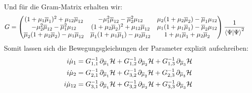 \noindent Und für die Gram-Matrix erhalten wir:
\begin{align}
    G &=
    \begin{pmatrix}
        (1+\mu_1\overline{\mu}_1)^2 + \mu_{12}\overline{\mu}_{12} & -\mu_1^2\overline{\mu}_{12} - \overline{\mu}_2^2\mu_{12} &  \mu_2(1+\mu_2\overline{\mu}_2)-\overline{\mu}_1\mu_{12}\\
        -\mu_2^2\overline{\mu}_{12} - \overline{\mu}_1^2\mu_{12} &(1+\mu_2\overline{\mu}_2)^2 + \mu_{12}\overline{\mu}_{12} & \mu_1(1+\mu_1\overline{\mu}_1)-\overline{\mu}_2\mu_{12}\\
        \overline{\mu}_2(1+\mu_2\overline{\mu}_2)-\mu_1\overline{\mu}_{12} & \overline{\mu}_1(1+\mu_1\overline{\mu}_1)-\mu_2\overline{\mu}_{12} & 1 + \mu_1\overline{\mu}_1 + \mu_2\overline{\mu}_2
    \end{pmatrix}\frac{1}{\bra{\Psi}\ket{\Psi}^2} 
\end{align}
Somit lassen sich die Bewegungsgleichungen der Parameter explizit aufschreiben:
\begin{align}
    i\dot{\mu}_1 &= G_{1,1}^{-1}\thinspace \partial_{\overline{\mu}_1}\mathcal{H} + G_{1,2}^{-1}\thinspace\partial_{\overline{\mu}_2}\mathcal{H} + G_{1,3}^{-1}\thinspace\partial_{\overline{\mu}_3}\mathcal{H} \\
    i\dot{\mu}_2 &= G_{2,1}^{-1}\thinspace\partial_{\overline{\mu}_1}\mathcal{H} + G_{3,2}^{-1\thinspace}\partial_{\overline{\mu}_2}\mathcal{H} + G_{2,3}^{-1}\thinspace\partial_{\overline{\mu}_3}\mathcal{H} \\
    i\dot{\mu}_{12} &= G_{3,1}^{-1}\thinspace\partial_{\overline{\mu}_1}\mathcal{H} + G_{3,2}^{-1}\thinspace\partial_{\overline{\mu}_2}\mathcal{H} + G_{3,3}^{-1}\thinspace\partial_{\overline{\mu}_3}\mathcal{H} 
\end{align}




